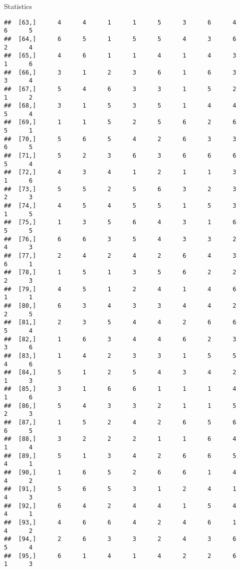 \documentclass[
  ignorenonframetext,
]{beamer}
\begin{document}
\begin{frame}[fragile]{Statistics}
\begin{verbatim}
##  [63,]      4      4      1      1      5      3      6      4      6      5
##  [64,]      6      5      1      5      5      4      3      6      2      4
##  [65,]      4      6      1      1      4      1      4      3      1      6
##  [66,]      3      1      2      3      6      1      6      3      3      4
##  [67,]      5      4      6      3      3      1      5      2      1      2
##  [68,]      3      1      5      3      5      1      4      4      5      4
##  [69,]      1      1      5      2      5      6      2      6      5      1
##  [70,]      5      6      5      4      2      6      3      3      6      5
##  [71,]      5      2      3      6      3      6      6      6      5      4
##  [72,]      4      3      4      1      2      1      1      3      1      6
##  [73,]      5      5      2      5      6      3      2      3      2      3
##  [74,]      4      5      4      5      5      1      5      3      1      5
##  [75,]      1      3      5      6      4      3      1      6      5      5
##  [76,]      6      6      3      5      4      3      3      2      4      3
##  [77,]      2      4      2      4      2      6      4      3      6      1
##  [78,]      1      5      1      3      5      6      2      2      2      3
##  [79,]      4      5      1      2      4      1      4      6      1      1
##  [80,]      6      3      4      3      3      4      4      2      2      5
##  [81,]      2      3      5      4      4      2      6      6      5      4
##  [82,]      1      6      3      4      4      6      2      3      3      6
##  [83,]      1      4      2      3      3      1      5      5      4      6
##  [84,]      5      1      2      5      4      3      4      2      1      3
##  [85,]      3      1      6      6      1      1      1      4      1      6
##  [86,]      5      4      3      3      2      1      1      5      2      3
##  [87,]      1      5      2      4      2      6      5      6      6      5
##  [88,]      3      2      2      2      1      1      6      4      1      4
##  [89,]      5      1      3      4      2      6      6      5      4      1
##  [90,]      1      6      5      2      6      6      1      4      4      2
##  [91,]      5      6      5      3      1      2      4      1      4      3
##  [92,]      6      4      2      4      4      1      5      4      4      1
##  [93,]      4      6      6      4      2      4      6      1      4      2
##  [94,]      2      6      3      3      2      4      3      6      5      4
##  [95,]      6      1      4      1      4      2      2      6      1      3

\end{verbatim}
\end{frame}
\end{document}
